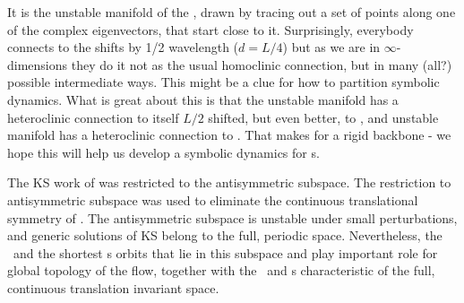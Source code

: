 
 It is the unstable manifold of the 
{\eqv}, drawn by tracing out a set of points along one of the complex
eigenvectors, that start close to it. Surprisingly, everybody connects
to the  shifts by 1/2 wavelength ($d = L/4$) but as we are in
$\infty$-dimensions they do it not as the usual homoclinic connection, but in
many (all?) possible intermediate ways. This might be a clue for how to
partition symbolic dynamics.
What is great about
this is that the  unstable manifold has a heteroclinic connection to itself
$L/2$ shifted, but
even better, to , and  unstable manifold has a heteroclinic
connection to .
That makes for a rigid backbone -
we hope this will help us develop a symbolic dynamics for \rpo s.

The KS work
of  was restricted to the
antisymmetric subspace. The restriction to antisymmetric
subspace was used to eliminate the continuous translational
symmetry of \KSe. The antisymmetric subspace is unstable
under small perturbations, and generic solutions of KS belong
to the full, periodic space. Nevertheless, the \eqva\ and the
shortest \po s orbits that lie in this subspace and play
important role for global topology of the flow, together with
the \reqva\ and \rpo s characteristic of the full, continuous
translation invariant space.

